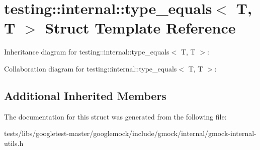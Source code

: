 \hypertarget{structtesting_1_1internal_1_1type__equals_3_01T_00_01T_01_4}{}\section{testing\+:\+:internal\+:\+:type\+\_\+equals$<$ T, T $>$ Struct Template Reference}
\label{structtesting_1_1internal_1_1type__equals_3_01T_00_01T_01_4}


Inheritance diagram for testing\+:\+:internal\+:\+:type\+\_\+equals$<$ T, T $>$\+:


Collaboration diagram for testing\+:\+:internal\+:\+:type\+\_\+equals$<$ T, T $>$\+:
\subsection*{Additional Inherited Members}


The documentation for this struct was generated from the following file\+:\begin{DoxyCompactItemize}
\item 
tests/libs/googletest-\/master/googlemock/include/gmock/internal/gmock-\/internal-\/utils.\+h\end{DoxyCompactItemize}
